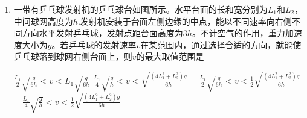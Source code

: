 \begin{enumerate}[leftmargin=0em]
\begin{enumerate}
\end{enumerate}
\begin{figure}[h!]
\flushright

\end{figure}






\item 
{}
一带有乒乓球发射机的乒乓球台如图所示。水平台面的长和宽分别为$ L_{1} $和$ L_{2} $，中间球网高度为$ h $.发射机安装于台面左侧边缘的中点，能以不同速率向右侧不同方向水平发射乒乓球，发射点距台面高度为$ 3 h $。不计空气的作用，重力加速度大小为$ g $。若乒乓球的发射速率$ v $在某范围内，通过选择合适的方向，就能使乒乓球落到球网右侧台面上，则$ v $的最大取值范围是  
\begin{figure}[h!]
\centering

\end{figure}

\fourchoices
{$\frac { L _ { 1 } } { 2 } \sqrt { \frac { g } { 6 h } } < v < L _ { 1 } \sqrt { \frac { g } { 6 h } }$}
{$\frac { L _ { 1 } } { 4 } \sqrt { \frac { g } { h } } < v < \sqrt { \frac { \left( 4 L _ { 1 } ^ { 2 } + L _ { 2 } ^ { 2 } \right) g } { 6 h } }$}
{$\quad \frac { L _ { 1 } } { 2 } \sqrt { \frac { g } { 6 h } } < v < \frac { 1 } { 2 } \sqrt { \frac { \left( 4 L _ { 1 } ^ { 2 } + L _ { 2 } ^ { 2 } \right) g } { 6 h } }$}
{$\quad \frac { L _ { 1 } } { 4 } \sqrt { \frac { g } { h } } < v < \frac { 1 } { 2 } \sqrt { \frac { \left( 4 L _ { 1 } ^ { 2 } + L _ { 2 } ^ { 2 } \right) g } { 6 h } }$}


\end{enumerate}
